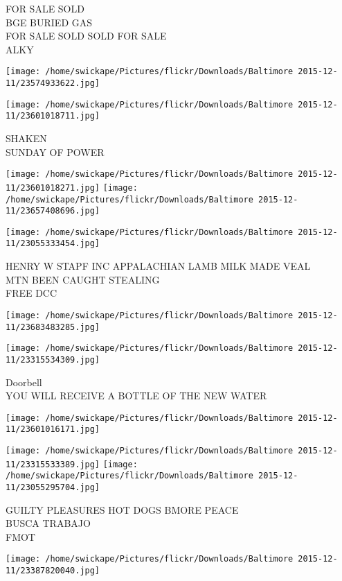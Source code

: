 \documentclass[10pt,letterpaper]{article}
\begin{document}
FOR SALE SOLD\\
BGE BURIED GAS\\
FOR SALE SOLD SOLD FOR SALE\\
ALKY
\pagebreak

\texttt{[image: /home/swickape/Pictures/flickr/Downloads/Baltimore 2015-12-11/23574933622.jpg]}

\vspace{0.25in}
\texttt{[image: /home/swickape/Pictures/flickr/Downloads/Baltimore 2015-12-11/23601018711.jpg]}

SHAKEN\\
SUNDAY OF POWER
\pagebreak

\texttt{[image: /home/swickape/Pictures/flickr/Downloads/Baltimore 2015-12-11/23601018271.jpg]}
\texttt{[image: /home/swickape/Pictures/flickr/Downloads/Baltimore 2015-12-11/23657408696.jpg]}

\texttt{[image: /home/swickape/Pictures/flickr/Downloads/Baltimore 2015-12-11/23055333454.jpg]}

HENRY W STAPF INC APPALACHIAN LAMB MILK MADE VEAL\\
MTN BEEN CAUGHT STEALING\\
FREE DCC
\pagebreak

\texttt{[image: /home/swickape/Pictures/flickr/Downloads/Baltimore 2015-12-11/23683483285.jpg]}

\vspace{0.25in}
\texttt{[image: /home/swickape/Pictures/flickr/Downloads/Baltimore 2015-12-11/23315534309.jpg]}

Doorbell\\
YOU WILL RECEIVE A BOTTLE OF THE NEW WATER
\pagebreak

\texttt{[image: /home/swickape/Pictures/flickr/Downloads/Baltimore 2015-12-11/23601016171.jpg]}

\vspace{0.25in}
\texttt{[image: /home/swickape/Pictures/flickr/Downloads/Baltimore 2015-12-11/23315533389.jpg]}
\texttt{[image: /home/swickape/Pictures/flickr/Downloads/Baltimore 2015-12-11/23055295704.jpg]}

GUILTY PLEASURES HOT DOGS BMORE PEACE\\
BUSCA TRABAJO\\
FMOT
\pagebreak

\texttt{[image: /home/swickape/Pictures/flickr/Downloads/Baltimore 2015-12-11/23387820040.jpg]}
\end{document}
